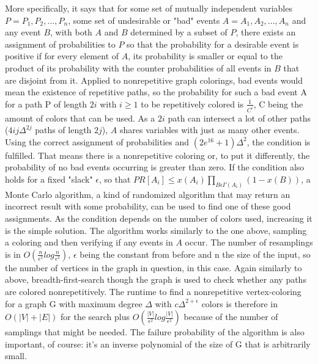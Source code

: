 \documentclass[12pt,a4paper]{article}
\begin{document}
More specifically, it says that for some set of mutually independent variables $P = {P_1, P_2, ..., P_n}$, some set of undesirable or "bad" events $A = {A_1, A_2, ..., A_n}$ and any event $B$, with both $A$ and $B$ determined by a subset of $P$, there exists an assignment of probabilities to $P$ so that the probability for a desirable event is positive if for every element of $A$, its probability is smaller or equal to the product of its probability with the counter probabilities of all events in $B$ that are disjoint from it.
\newline
Applied to nonrepetitive graph colorings, bad events would mean the existence of repetitive paths, so the probability for such a bad event A for a path P of length $2i$ with $i \geq 1$ to be repetitively colored is $\frac{1}{C^i}$, C being the amount of colors that can be used. As a $2i$ path can intersect a lot of other paths ($4ij\Delta^{2j}$ paths of length $2j$), $A$ shares variables with just as many other events. Using the correct assignment of probabilities and $(2e^{16}+1)\Delta^2$, the condition is fulfilled. That means there is a nonrepetitive coloring or, to put it differently, the probability of no bad events occurring is greater than zero. If the condition also holds for a fixed "slack" $\epsilon$, so that $PR[A_i] \leq x(A_i) {\prod\limits_{B \epsilon \Gamma(A_i)} (1-x(B))}$, a Monte Carlo algorithm, a kind of randomized algorithm that may return an incorrect result with some probability, can be used to find one of these good assignments. As the condition depends on the number of colors used, increasing it is the simple solution. 
\newline
The algorithm works similarly to the one above, sampling a coloring and then verifying if any events in $A$ occur. The number of resamplings is in $O(\frac{n}{\epsilon^2}log\frac{n}{\epsilon^2})$, $\epsilon$ being the constant from before and n the size of the input, so the number of vertices in the graph in question, in this case. Again similarly to above, breadth-first-search though the graph is used to check whether any paths are colored nonrepetitively. The runtime to find a nonrepetitive vertex-coloring for a graph G with maximum degree $\Delta$ with $c\Delta^{2+\epsilon}$ colors is therefore in $O(|V|+|E|)$ for the search plus $O(\frac{|V|}{\epsilon^2}log\frac{|V|}{\epsilon^2})$ because of the number of samplings that might be needed. The failure probability of the algorithm is also important, of course: it's an inverse polynomial of the size of G that is arbitrarily small. 
\end{document}
